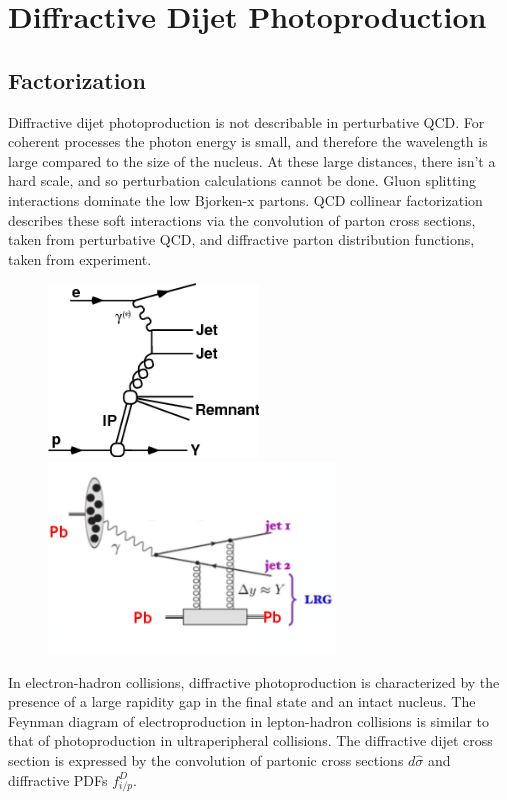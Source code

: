 
\chapter{Diffractive Dijet Photoproduction}

\section{Factorization}

Diffractive dijet photoproduction is not describable in perturbative QCD. For coherent processes the photon energy is small, and therefore the wavelength is large compared to the size of the nucleus. At these large distances, there isn't a hard scale, and so perturbation calculations cannot be done. Gluon splitting interactions dominate the low Bjorken-x partons. QCD collinear factorization describes these soft interactions via the convolution of parton cross sections, taken from perturbative QCD, and diffractive parton distribution functions, taken from experiment. 

\begin{figure}[h!]
\begin{centering}
\includegraphics[width=2.2in]{Chapter2/importfigs/fig1a.png}
\includegraphics[width=3in]{Chapter2/importfigs/fig3_daniel_upc.png}
\par\end{centering}
\end{figure}

In electron-hadron collisions, diffractive photoproduction is characterized by the presence of a large rapidity gap in the final state and an intact nucleus. The Feynman diagram of electroproduction in lepton-hadron collisions is similar to that of photoproduction in ultraperipheral collisions. The diffractive dijet cross section is expressed by the convolution of partonic cross sections $d\hat{\sigma}$ and diffractive PDFs $f^D_{i/p}$.

